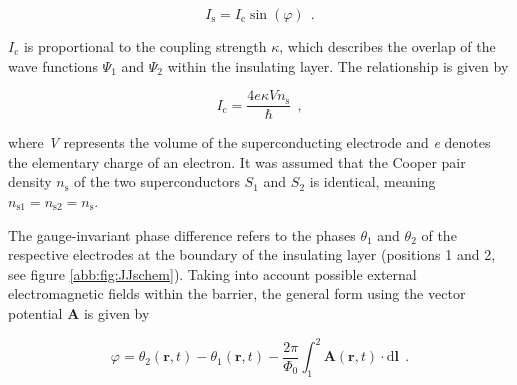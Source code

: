  

\begin{equation}
\label{1.JE}
I_\mathrm{s} = I_\mathrm{c}\sin(\varphi) \ \ .
\end{equation}


$I_\mathrm{c}$ is proportional to the coupling strength $\kappa$, which describes the overlap of the wave functions $\Psi_1$ and $\Psi_2$ within the insulating layer. The relationship is given by

\begin{equation}
I_\mathrm{c} = \frac{4e\kappa V n_\mathrm{s}}{\hbar} \ \ ,
\end{equation}


where \textit{V} represents the volume of the superconducting electrode and \textit{e} denotes the elementary charge of an electron. It was assumed that the Cooper pair density $n_\mathrm{s}$ of the two superconductors $S_1$ and $S_2$ is identical, meaning $n_{\mathrm{s}1} = n_{\mathrm{s}2} = n_\mathrm{s}$.

The gauge-invariant phase difference refers to the phases $\theta_1$ and $\theta_2$ of the respective electrodes at the boundary of the insulating layer (positions 1 and 2, see figure \ref{abb:fig:JJschem}). Taking into account possible external electromagnetic fields within the barrier, the general form using the vector potential \textbf{A} is given by \cite{Gross2016}

\begin{equation}
\label{EichInv_Phase}
\varphi = \theta_2(\textbf{r},t) - \theta_1(\textbf{r},t) - \frac{2\pi}{\Phi_0}\int_{1}^{2}\textbf{A}(\textbf{r},t)\cdot \mathrm{d}\textbf{l} \ \ .
\end{equation}

